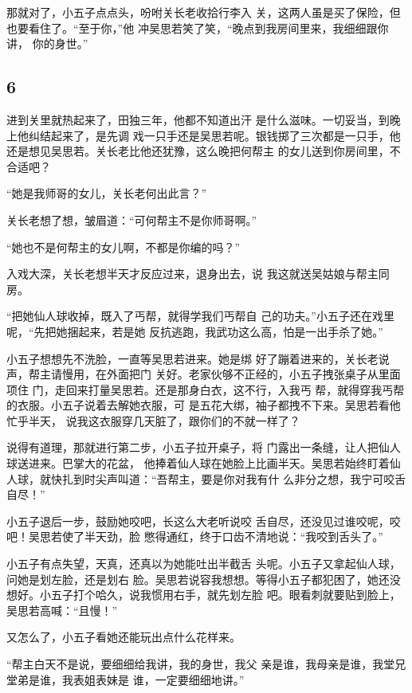 那就对了，小五子点点头，吩咐关长老收拾行李入
关，这两人虽是买了保险，但也要看住了。“至于你，”他
冲吴思若笑了笑，“晚点到我房间里来，我细细跟你讲，
你的身世。”
\newline

{\centering\subsection{6}}

进到关里就热起来了，田独三年，他都不知道出汗
是什么滋味。一切妥当，到晚上他纠结起来了，是先调
戏一只手还是吴思若呢。银钱掷了三次都是一只手，他
还是想见吴思若。关长老比他还犹豫，这么晚把何帮主
的女儿送到你房间里，不合适吧？

“她是我师哥的女儿，关长老何出此言？”

关长老想了想，皱眉道：“可何帮主不是你师哥啊。”

“她也不是何帮主的女儿啊，不都是你编的吗？”

入戏大深，关长老想半天才反应过来，退身出去，说
我这就送吴姑娘与帮主同房。

“把她仙人球收掉，既入了丐帮，就得学我们丐帮自
己的功夫。”小五子还在戏里呢，“先把她捆起来，若是她
反抗逃跑，我武功这么高，怕是一出手杀了她。”

小五子想想先不洗脸，一直等吴思若进来。她是绑
好了蹦着进来的，关长老说声，帮主请慢用，在外面把门
关好。老家伙够不正经的，小五子拽张桌子从里面项住
门，走回来打量吴思若。还是那身白衣，这不行，入我丐
帮，就得穿我丐帮的衣服。小五子说着去解她衣服，可
是五花大绑，袖子都拽不下来。吴思若看他忙乎半天，
说我这衣服穿几天脏了，跟你们的不就一样了？

说得有道理，那就进行第二步，小五子拉开桌子，将
门露出一条缝，让人把仙人球送进来。巴掌大的花盆，
他捧着仙人球在她脸上比画半天。吴思若始终盯着仙
人球，就快扎到时尖声叫道：“吾帮主，要是你对我有什
么非分之想，我宁可咬舌自尽！”

小五子退后一步，鼓励她咬吧，长这么大老听说咬
舌自尽，还没见过谁咬呢，咬吧！吴思若使了半天劲，脸
憋得通红，终于口齿不清地说：“我咬到舌头了。”

小五子有点失望，天真，还真以为她能吐出半截舌
头呢。小五子又拿起仙人球，问她是划左脸，还是划右
脸。吴思若说容我想想。等得小五子都犯困了，她还没
想好。小五子打个哈久，说我惯用右手，就先划左脸
吧。眼看刺就要贴到脸上，吴思若高喊：“且慢！”

又怎么了，小五子看她还能玩出点什么花样来。

“帮主白天不是说，要细细给我讲，我的身世，我父
亲是谁，我母亲是谁，我堂兄堂弟是谁，我表姐表妹是
谁，一定要细细地讲。”

